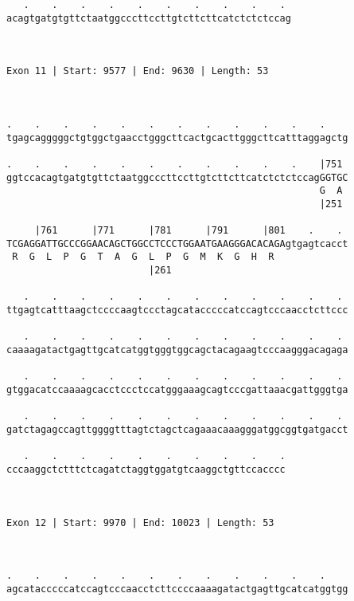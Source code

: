 \documentclass{article}
\begin{document}
\begin{Verbatim}
   .    .    .    .    .    .    .    .    .    . 
acagtgatgtgttctaatggcccttccttgtcttcttcatctctctccag
                                                  
                                                  
 
Exon 11 | Start: 9577 | End: 9630 | Length: 53



.    .    .    .    .    .    .    .    .    .    .    .    
tgagcagggggctgtggctgaacctgggcttcactgcacttgggcttcatttaggagctg
                                                            
.    .    .    .    .    .    .    .    .    .    .    |751 
ggtccacagtgatgtgttctaatggcccttccttgtcttcttcatctctctccagGGTGC
                                                       G  A 
                                                       |251 
  
     |761      |771      |781      |791      |801    .    . 
TCGAGGATTGCCCGGAACAGCTGGCCTCCCTGGAATGAAGGGACACAGAgtgagtcacct
 R  G  L  P  G  T  A  G  L  P  G  M  K  G  H  R             
                         |261                               
  
   .    .    .    .    .    .    .    .    .    .    .    . 
ttgagtcatttaagctccccaagtccctagcatacccccatccagtcccaacctcttccc
                                                            
   .    .    .    .    .    .    .    .    .    .    .    . 
caaaagatactgagttgcatcatggtgggtggcagctacagaagtcccaagggacagaga
                                                            
   .    .    .    .    .    .    .    .    .    .    .    . 
gtggacatccaaaagcacctccctccatgggaaagcagtcccgattaaacgattgggtga
                                                            
   .    .    .    .    .    .    .    .    .    .    .    . 
gatctagagccagttggggtttagtctagctcagaaacaaagggatggcggtgatgacct
                                                            
   .    .    .    .    .    .    .    .    .    .
cccaaggctctttctcagatctaggtggatgtcaaggctgttccacccc
                                                 
                                                 
 
Exon 12 | Start: 9970 | End: 10023 | Length: 53



.    .    .    .    .    .    .    .    .    .    .    .    
agcatacccccatccagtcccaacctcttccccaaaagatactgagttgcatcatggtgg
                                                            

\end{Verbatim}
\end{document}
